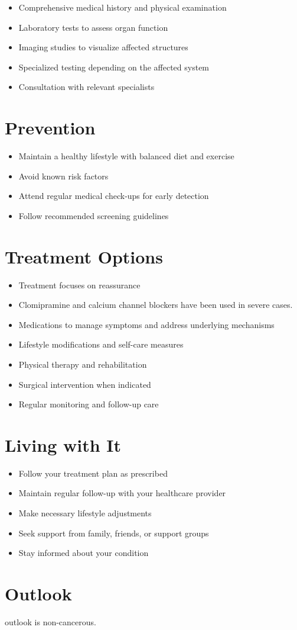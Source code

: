 \begin{itemize}[noitemsep]
  \item Comprehensive medical history and physical examination
  \item Laboratory tests to assess organ function
  \item Imaging studies to visualize affected structures
  \item Specialized testing depending on the affected system
  \item Consultation with relevant specialists
\end{itemize}
\section{Prevention}
\begin{itemize}[noitemsep]
  \item Maintain a healthy lifestyle with balanced diet and exercise
  \item Avoid known risk factors
  \item Attend regular medical check-ups for early detection
  \item Follow recommended screening guidelines
\end{itemize}
\section{Treatment Options}
\begin{itemize}[noitemsep]
  \item Treatment focuses on reassurance
  \item Clomipramine and calcium channel blockers have been used in severe cases.
  \item Medications to manage symptoms and address underlying mechanisms
  \item Lifestyle modifications and self-care measures
  \item Physical therapy and rehabilitation
  \item Surgical intervention when indicated
  \item Regular monitoring and follow-up care
\end{itemize}
\section{Living with It}
\begin{itemize}[noitemsep]
  \item Follow your treatment plan as prescribed
  \item Maintain regular follow-up with your healthcare provider
  \item Make necessary lifestyle adjustments
  \item Seek support from family, friends, or support groups
  \item Stay informed about your condition
\end{itemize}
\section{Outlook}
outlook is non-cancerous.
